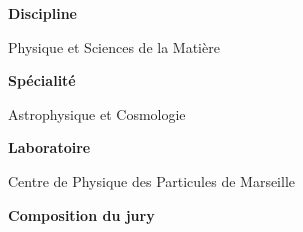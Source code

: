 \vspace{1em}

\begin{center}
	\begin{minipage}[t]{.4\linewidth}
    	    \vspace{.5em}
        	\textbf{Discipline}
			
			\vspace{1em}

        	{Physique et Sciences de la Matière}
        	
    	    \vspace{2em}
        	
			\textbf{Spécialité}
			
			\vspace{1em}

        	{Astrophysique et Cosmologie}
        	
    	    \vspace{2em}

        	\textbf{Laboratoire}
			
			\vspace{1em}

        	{Centre de Physique des Particules de Marseille}
	\end{minipage}\hfill
	\begin{minipage}[t]{.03\linewidth}
	    \dvertline{4pt}{-16em}
	\end{minipage}\hfill
	\begin{minipage}[t]{.57\linewidth}
	    \vspace{.5em}
    	\textbf{Composition du jury}


\end{minipage}
\end{center}
